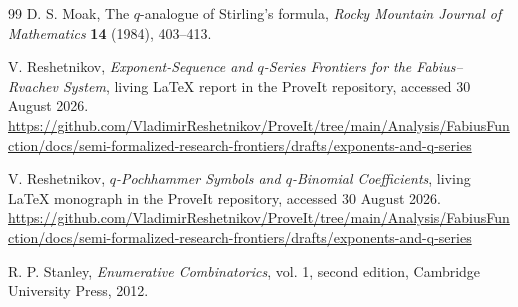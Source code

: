 \documentclass[11pt,a4paper,oneside,openany]{book}
\theoremstyle{definition}
\theoremstyle{remark}
\begin{document}
\begin{thebibliography}{99}
D. S. Moak,
The \(q\)-analogue of Stirling's formula,
\emph{Rocky Mountain Journal of Mathematics} \textbf{14} (1984), 403--413.

V. Reshetnikov,
\emph{Exponent-Sequence and \(q\)-Series Frontiers for the
Fabius--Rvachev System}, living LaTeX report in the ProveIt repository,
accessed 30 August 2026.
\url{https://github.com/VladimirReshetnikov/ProveIt/tree/main/Analysis/FabiusFunction/docs/semi-formalized-research-frontiers/drafts/exponents-and-q-series}

V. Reshetnikov,
\emph{\(q\)-Pochhammer Symbols and \(q\)-Binomial Coefficients}, living
LaTeX monograph in the ProveIt repository, accessed 30 August 2026.
\url{https://github.com/VladimirReshetnikov/ProveIt/tree/main/Analysis/FabiusFunction/docs/semi-formalized-research-frontiers/drafts/exponents-and-q-series}

R. P. Stanley,
\emph{Enumerative Combinatorics}, vol. 1, second edition, Cambridge University
Press, 2012.

\end{thebibliography}
\end{document}
